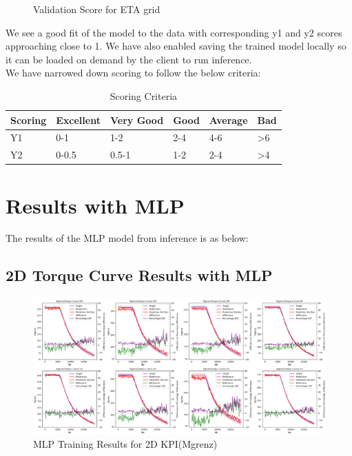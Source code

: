 \documentclass{report} %
\begin{document}
\begin{figure}[H]
\begin{minipage}[b]{0.3\textwidth}
        \caption{\centering Validation Score for ETA grid}
        \label{fig:Validation Score for ETA grid}
    \end{minipage}
\end{figure}

We see a good fit of the model to the data with corresponding y1 and y2 scores approaching close to 1.
We have also enabled saving the trained model locally so it can be loaded on demand by the client to run inference.\\

We have narrowed down scoring to follow the below criteria:

\begin{table}[H]
    \centering
    \begin{tabularx}{1\linewidth}{|X|X|X|X|X|X|}
    \hline {\bf Scoring} & {\bf Excellent} & {\bf Very Good} & {\bf Good} & {\bf Average} & {\bf Bad}\\
    \hline 
    Y1 & 0-1 & 1-2 & 2-4 & 4-6 & \textgreater 6\\
    Y2 & 0-0.5 & 0.5-1 & 1-2 & 2-4 & \textgreater 4\\
    \hline
    \end{tabularx}
    \caption{Scoring Criteria}
    \label{tab:Scoring Criteria}
\end{table}


\section{Results with \ac{MLP}}\label{sec:Results with MLP}

The results of the \ac{MLP} model from inference is as below: \\

\subsection{2D Torque Curve Results with \ac{MLP}}\label{sec:2D Torque Curve Results with MLP}

\begin{figure}[H]
    \centering
    \includegraphics[width=1\textwidth]{./ReportImages/KPI2D_predictions.png} 
    \caption{MLP Training Results for 2D KPI(Mgrenz)} 
    \label{fig:MLP Training Results for 2D KPI(Mgrenz)}
\end{figure}
\end{document}
